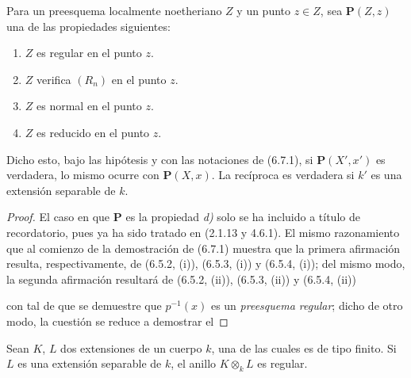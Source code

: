 \begin{proposition}[6.7.4]
\label{IV.2.s6.7.4-fr}
Para un preesquema localmente noetheriano $Z$ y un punto $z\in Z$,
sea $\boldsymbol{P}(Z,z)$ una de las propiedades siguientes:
\begin{enumerate}
\item[\textup{a)}] $Z$ es regular en el punto $z$.
\item[\textup{b)}] $Z$ verifica $(R_n)$ en el punto $z$.
\item[\textup{c)}] $Z$ es normal en el punto $z$.
\item[\textup{d)}] $Z$ es reducido en el punto $z$.
\end{enumerate}
Dicho esto, bajo las hipótesis y con las notaciones de \textup{(6.7.1)}, si
$\boldsymbol{P}(X',x')$ es verdadera, lo mismo ocurre con $\boldsymbol{P}(X,x)$. La recíproca es
verdadera si $k'$ es una extensión separable de $k$.
\end{proposition}

\begin{proof}
El caso en que $\boldsymbol{P}$ es la propiedad \emph{d)} solo se ha incluido a título de
recordatorio, pues ya ha sido tratado en (2.1.13 y 4.6.1). El mismo
razonamiento que al comienzo de la demostración de (6.7.1) muestra que la
primera afirmación resulta, respectivamente, de (6.5.2, (i)), (6.5.3, (i))
y (6.5.4, (i)); del mismo modo, la segunda afirmación resultará de (6.5.2,
(ii)), (6.5.3, (ii)) y (6.5.4, (ii))


con tal de que se demuestre que $p^{-1}(x)$ es un \emph{preesquema regular}; dicho
de otro modo, la cuestión se reduce a demostrar el
\end{proof}

\begin{lemma}[6.7.4.1]
\label{IV.2.s6.7.4.1-fr}
Sean $K$, $L$ dos extensiones de un cuerpo $k$, una de las cuales es de tipo
finito. Si $L$ es una extensión separable de $k$, el anillo $K\otimes_kL$
es regular.
\end{lemma}

